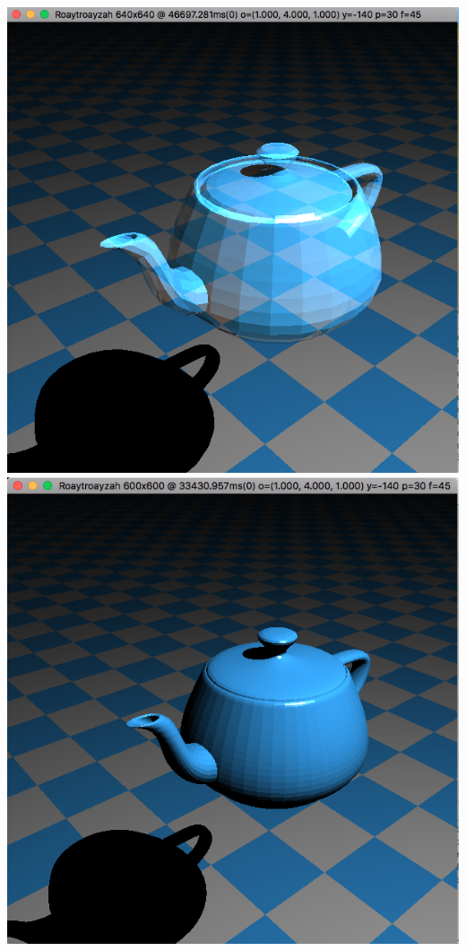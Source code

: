 \includegraphics[width=\textwidth]{img/ghostTeapot}
\includegraphics[width=\textwidth]{img/hiresTeapot}
